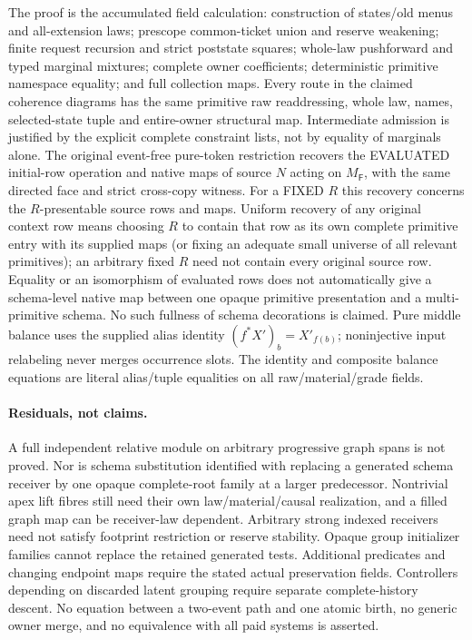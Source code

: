 \documentclass[11pt]{article}
\begin{document}
The proof is the accumulated field calculation: construction of states/old menus and all-extension laws; prescope common-ticket union and reserve weakening; finite request recursion and strict poststate squares; whole-law pushforward and typed marginal mixtures; complete owner coefficients; deterministic primitive namespace equality; and full collection maps. Every route in the claimed coherence diagrams has the same primitive raw readdressing, whole law, names, selected-state tuple and entire-owner structural map. Intermediate admission is justified by the explicit complete constraint lists, not by equality of marginals alone. The original event-free pure-token restriction recovers the EVALUATED initial-row operation and native maps of source $N$ acting on $M_{\mathsf F}$, with the same directed face and strict cross-copy witness. For a FIXED $R$ this recovery concerns the $R$-presentable source rows and maps. Uniform recovery of any original context row means choosing $R$ to contain that row as its own complete primitive entry with its supplied maps (or fixing an adequate small universe of all relevant primitives); an arbitrary fixed $R$ need not contain every original source row. Equality or an isomorphism of evaluated rows does not automatically give a schema-level native map between one opaque primitive presentation and a multi-primitive schema. No such fullness of schema decorations is claimed. Pure middle balance uses the supplied alias identity $(f^*X')_b=X'_{f(b)}$; noninjective input relabeling never merges occurrence slots. The identity and composite balance equations are literal alias/tuple equalities on all raw/material/grade fields.

\paragraph{Residuals, not claims.}
A full independent relative module on arbitrary progressive graph spans is not proved. Nor is schema substitution identified with replacing a generated schema receiver by one opaque complete-root family at a larger predecessor. Nontrivial apex lift fibres still need their own law/material/causal realization, and a filled graph map can be receiver-law dependent. Arbitrary strong indexed receivers need not satisfy footprint restriction or reserve stability. Opaque group initializer families cannot replace the retained generated tests. Additional predicates and changing endpoint maps require the stated actual preservation fields. Controllers depending on discarded latent grouping require separate complete-history descent. No equation between a two-event path and one atomic birth, no generic owner merge, and no equivalence with all paid systems is asserted.
\end{document}
